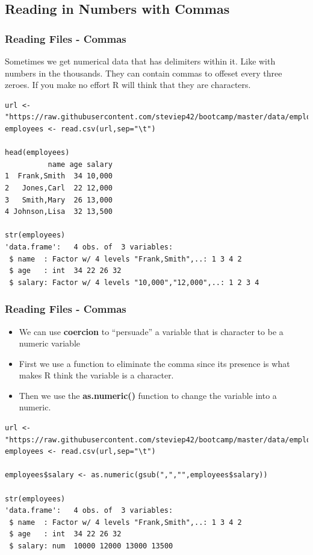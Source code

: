\documentclass{beamer}
\begin{document}
\subsection{Reading in Numbers with Commas}
\begin{frame}[fragile]
\frametitle{Reading Files - Commas}
Sometimes we get numerical data that has delimiters within it. Like with numbers in the thousands.
They can contain commas to offeset every three zeroes. If you make no effort R will think
that they are characters. 
\tiny
\begin{verbatim}
url <- "https://raw.githubusercontent.com/steviep42/bootcamp/master/data/employees.csv"
employees <- read.csv(url,sep="\t")

head(employees)
          name age salary
1  Frank,Smith  34 10,000
2   Jones,Carl  22 12,000
3   Smith,Mary  26 13,000
4 Johnson,Lisa  32 13,500

str(employees)
'data.frame':	4 obs. of  3 variables:
 $ name  : Factor w/ 4 levels "Frank,Smith",..: 1 3 4 2
 $ age   : int  34 22 26 32
 $ salary: Factor w/ 4 levels "10,000","12,000",..: 1 2 3 4
\end{verbatim}
\footnotesize
\end{frame}

%

\begin{frame}[fragile]
\frametitle{Reading Files - Commas}
\begin{itemize}
\item We can use \textbf{coercion} to ``persuade'' a variable that is character to be a numeric variable
\item First we use a function to eliminate the comma since its presence is what makes R think the variable is a character. 
\item Then we use the \textbf{as.numeric()} function to change the variable into a numeric.
\end{itemize}
\tiny
\begin{verbatim}
url <- "https://raw.githubusercontent.com/steviep42/bootcamp/master/data/employees.csv"
employees <- read.csv(url,sep="\t")

employees$salary <- as.numeric(gsub(",","",employees$salary))
 
str(employees)
'data.frame':	4 obs. of  3 variables:
 $ name  : Factor w/ 4 levels "Frank,Smith",..: 1 3 4 2
 $ age   : int  34 22 26 32
 $ salary: num  10000 12000 13000 13500

\end{verbatim}
\footnotesize
\end{frame}
\end{document}
